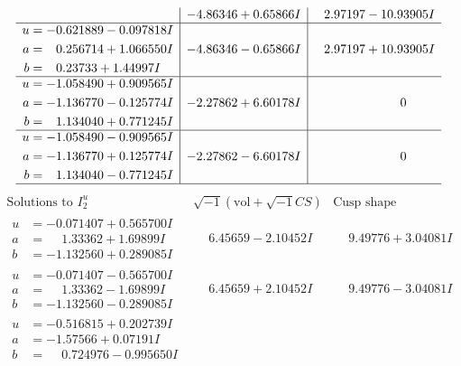 \documentclass[1p]{elsarticle_modified}
\theoremstyle{definition}
\newcommand{\I}{\sqrt{-1}}
\begin{document}
$$\begin{array}{c|c|c}
 & -4.86346 + 0.65866 I & \phantom{-}2.97197 - 10.93905 I \\ \hline\begin{aligned}
u &= -0.621889 - 0.097818 I \\
a &= \phantom{-}0.256714 + 1.066550 I \\
b &= \phantom{-}0.23733 + 1.44997 I\end{aligned}
 & -4.86346 - 0.65866 I & \phantom{-}2.97197 + 10.93905 I \\ \hline\begin{aligned}
u &= -1.058490 + 0.909565 I \\
a &= -1.136770 - 0.125774 I \\
b &= \phantom{-}1.134040 + 0.771245 I\end{aligned}
 & -2.27862 + 6.60178 I & \phantom{-0.000000 } 0 \\ \hline\begin{aligned}
u &= -1.058490 - 0.909565 I \\
a &= -1.136770 + 0.125774 I \\
b &= \phantom{-}1.134040 - 0.771245 I\end{aligned}
 & -2.27862 - 6.60178 I & \phantom{-0.000000 } 0\\
 \hline 
 \end{array}$$\newpage$$\begin{array}{c|c|c}  
\text{Solutions to }I^u_{2}& \I (\text{vol} + \sqrt{-1}CS) & \text{Cusp shape}\\
 \hline 
\begin{aligned}
u &= -0.071407 + 0.565700 I \\
a &= \phantom{-}1.33362 + 1.69899 I \\
b &= -1.132560 + 0.289085 I\end{aligned}
 & \phantom{-}6.45659 - 2.10452 I & \phantom{-}9.49776 + 3.04081 I \\ \hline\begin{aligned}
u &= -0.071407 - 0.565700 I \\
a &= \phantom{-}1.33362 - 1.69899 I \\
b &= -1.132560 - 0.289085 I\end{aligned}
 & \phantom{-}6.45659 + 2.10452 I & \phantom{-}9.49776 - 3.04081 I \\ \hline\begin{aligned}
u &= -0.516815 + 0.202739 I \\
a &= -1.57566 + 0.07191 I \\
b &= \phantom{-}0.724976 - 0.995650 I\end{aligned}

\end{array}$$
\end{document}
